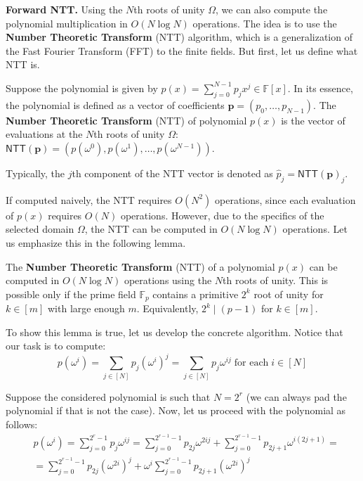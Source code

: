 \documentclass[../../book.tex]{subfiles}
\begin{document}
\textcolor{blue!60!black}{\textbf{Forward NTT.}} Using the $N$th roots of unity $\Omega$, we can also compute the polynomial
multiplication in $O(N \log N)$ operations. The idea is to use the \textbf{Number
Theoretic Transform} (NTT) algorithm, which is a generalization of the Fast
Fourier Transform (FFT) to the finite fields. But first, let us define 
what NTT is.

\begin{definition}[NTT]
    Suppose the polynomial is given by $p(x) = \sum_{j=0}^{N-1}p_jx^j \in \mathbb{F}[x]$. In its
    essence, the polynomial is defined as a vector of coefficients
    $\boldsymbol{p}=(p_0,\dots,p_{N-1})$. The \textbf{Number Theoretic
    Transform} (NTT) of polynomial $p(x)$ is the vector of evaluations at 
    the $N$th roots of unity $\Omega$:
    $\mathsf{NTT}(\boldsymbol{p}) =
    (p(\omega^0),p(\omega^1),\dots,p(\omega^{N-1}))$.
\end{definition}

\begin{remark}
    Typically, the $j$th component of the NTT vector is denoted as $\hat{p}_j = \mathsf{NTT}(\boldsymbol{p})_j$.
\end{remark}

If computed naively, the NTT requires $O(N^2)$ operations, since each 
evaluation of $p(x)$ requires $O(N)$ operations. However, due to the 
specifics of the selected domain $\Omega$, the NTT can be computed in
$O(N \log N)$ operations. Let us emphasize this in the following lemma.

\begin{lemma}
    The \textbf{Number Theoretic Transform} (NTT) of a polynomial $p(x)$ can be
    computed in $O(N \log N)$ operations using the $N$th roots of unity. This is
    possible only if the prime field $\mathbb{F}_p$ contains a primitive
    $2^k$ root of unity for $k \in [m]$ with large enough $m$. Equivalently, 
    $2^k \mid (p-1)$ for $k \in [m]$.
\end{lemma}

To show this lemma is true, let us develop the concrete algorithm. Notice that 
our task is to compute:
\begin{equation*}
    p(\omega^i) = \sum_{j \in [N]} p_j (\omega^i)^j = \sum_{j \in [N]} p_j \omega^{ij} \; \text{for each} \; i \in [N]
\end{equation*}

Suppose the considered polynomial is such that $N=2^r$ (we can always pad the
polynomial if that is not the case). Now, let us proceed with the polynomial as
follows:
\begin{equation*}
    \begin{aligned}
        &p(\omega^i) = \sum_{j=0}^{2^{r}-1}p_j\omega^{ij} = \sum_{j=0}^{2^{r-1}-1}p_{2j}\omega^{2ij} + \sum_{j=0}^{2^{r-1}-1}p_{2j+1}\omega^{i(2j+1)} = \\
        &= \sum_{j=0}^{2^{r-1}-1}p_{2j}(\omega^{2i})^j + \omega^i\sum_{j=0}^{2^{r-1}-1}p_{2j+1} (\omega^{2i})^j
    \end{aligned}
\end{equation*}
\end{document}
